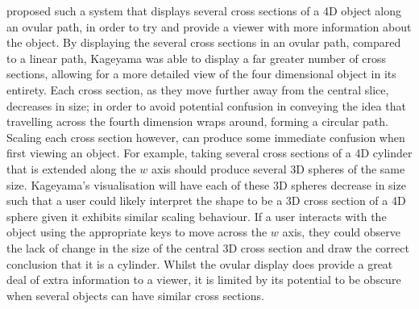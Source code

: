 \documentclass{l4proj}
\begin{document}
\citet{kageyama_visualization_2015} proposed such a system that displays several cross sections of a 4D object along an ovular path, in order to try and provide a viewer with more information about the object. 
%
By displaying the several cross sections in an ovular path, compared to a linear path, Kageyama was able to display a far greater number of cross sections, allowing for a more detailed view of the four dimensional object in its entirety.
%
Each cross section, as they move further away from the central slice, decreases in size; in order to avoid potential confusion in conveying the idea that travelling across the fourth dimension wraps around, forming a circular path.
%
Scaling each cross section however, can produce some immediate confusion when first viewing an object. For example, taking several cross sections of a 4D cylinder that is extended along the \(w\) axis should produce several 3D spheres of the same size. Kageyama's visualisation will have each of these 3D spheres decrease in size such that a user could likely interpret the shape to be a 3D cross section of a 4D sphere given it exhibits similar scaling behaviour. If a user interacts with the object using the appropriate keys to move across the \(w\) axis, they could observe the lack of change in the size of the central 3D cross section and draw the correct conclusion that it is a cylinder.
Whilst the ovular display does provide a great deal of extra information to a viewer, it is limited by its potential to be obscure when several objects can have similar cross sections.
\end{document}
